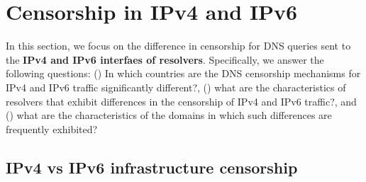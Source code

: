 \section{Censorship in IPv4 and IPv6}
\label{sec:infrastructure}

 In this section, we focus on the difference in censorship
for DNS queries sent to the \textbf{IPv4 and IPv6 interfaes of resolvers}.
%
Specifically, we answer the following questions:
%
() In which countries are the DNS censorship
mechanisms for IPv4 and IPv6 traffic significantly different?,
%
() what are the characteristics of resolvers
that exhibit differences in the censorship of IPv4 and IPv6 traffic?, and
%
() what are the characteristics of the domains
in which such differences are frequently exhibited?

\subsection{IPv4 vs IPv6 infrastructure censorship}
\label{sec:infrastructure:country}
